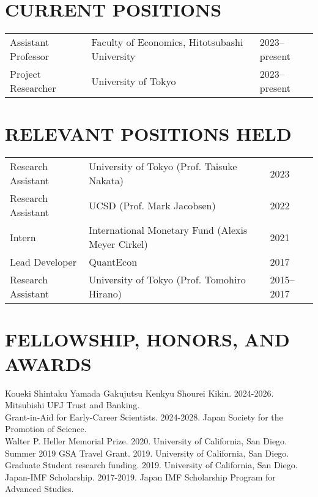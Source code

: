 \documentclass[12pt]{article}
\begin{document}
\section*{CURRENT POSITIONS}
\begin{tabular}{@{}lll}
Assistant Professor &Faculty of Economics, Hitotsubashi University& 2023--present\\
Project Researcher &University of Tokyo& 2023--present
\end{tabular}

\section*{RELEVANT POSITIONS HELD}
\begin{tabular}{@{}lll}
Research Assistant &University of Tokyo (Prof. Taisuke Nakata)& 2023\\
Research Assistant &UCSD (Prof. Mark Jacobsen)& 2022\\
Intern &International Monetary Fund (Alexis Meyer Cirkel)& 2021\\
Lead Developer &QuantEcon& 2017\\
Research Assistant &University of Tokyo (Prof. Tomohiro Hirano)& 2015--2017
\end{tabular}

\section*{FELLOWSHIP, HONORS, AND AWARDS}
Koueki Shintaku Yamada Gakujutsu Kenkyu Shourei Kikin. 2024-2026. Mitsubishi UFJ Trust and Banking.\\
Grant-in-Aid for Early-Career Scientists. 2024-2028. Japan Society for the Promotion of Science.\\
Walter P. Heller Memorial Prize. 2020. University of California, San Diego.\\
Summer 2019 GSA Travel Grant. 2019. University of California, San Diego.\\
Graduate Student research funding. 2019. University of California, San Diego.\\
Japan-IMF Scholarship. 2017-2019. Japan IMF Scholarship Program for Advanced Studies.
\end{document}
